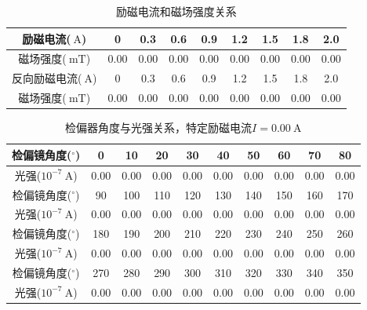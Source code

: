 \documentclass{ctexart}
\newcommand{\si}[1]{\  \mathrm{#1}}
\begin{document}
\newpage
\begin{table}[H]
      \centering
      \begin{tabular}{|c|c|c|c|c|c|c|c|c|}
        \hline
        励磁电流($\si{A}$) & 0 & 0.3 & 0.6 & 0.9 & 1.2 & 1.5 & 1.8 & 2.0 \\\hline
        磁场强度($\si{mT}$) & 0.00 & 0.00 & 0.00 & 0.00 & 0.00 & 0.00 & 0.00 & 0.00 \\\hline
        反向励磁电流($\si{A}$) & 0 & 0.3 & 0.6 & 0.9 & 1.2 & 1.5 & 1.8 & 2.0 \\\hline
        磁场强度($\si{mT}$) & 0.00 & 0.00 & 0.00 & 0.00 & 0.00 & 0.00 & 0.00 & 0.00  \\\hline
      \end{tabular}
      \caption{励磁电流和磁场强度关系}
    \end{table}
\newpage
\begin{table}[H]
      \centering
      \begin{tabular}{|c|c|c|c|c|c|c|c|c|c|}
        \hline
        检偏镜角度(${}^{\circ}$) & 0 & 10 & 20 & 30 & 40 & 50 & 60 & 70 & 80 \\\hline
        光强($10^{-7} \si{A}$)  & 0.00 & 0.00 & 0.00 & 0.00 & 0.00 & 0.00 & 0.00 & 0.00 & 0.00 \\\hline
        检偏镜角度(${}^{\circ}$) & 90 & 100 & 110 & 120 & 130 & 140 & 150 & 160 & 170 \\\hline
        光强($10^{-7} \si{A}$)  & 0.00 & 0.00 & 0.00 & 0.00 & 0.00 & 0.00 & 0.00 & 0.00 & 0.00  \\\hline
        检偏镜角度(${}^{\circ}$) & 180 & 190 & 200 & 210 & 220 & 230 & 240 & 250 & 260  \\\hline
        光强($10^{-7} \si{A}$)  & 0.00 & 0.00 & 0.00 & 0.00 & 0.00 & 0.00 & 0.00 & 0.00 & 0.00 \\\hline
        检偏镜角度(${}^{\circ}$) & 270 & 280 & 290 & 300 & 310 & 320 & 330 & 340 & 350 \\\hline
        光强($10^{-7} \si{A}$)  & 0.00 & 0.00 & 0.00 & 0.00 & 0.00 & 0.00 & 0.00 & 0.00 & 0.00 \\\hline
      \end{tabular}
      \caption{检偏器角度与光强关系，特定励磁电流$I=0.00 \si{A}$}
    \end{table}
\end{document}
